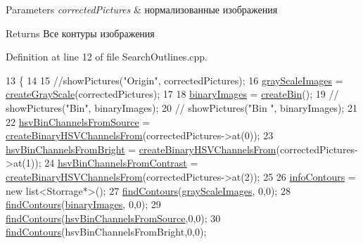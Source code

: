 \begin{DoxyParams}{Parameters}
{\em corrected\+Pictures} & нормализованные изображения \\
\hline
\end{DoxyParams}
\begin{DoxyReturn}{Returns}
Все контуры изображения 
\end{DoxyReturn}


Definition at line 12 of file Search\+Outlines.\+cpp.


\begin{DoxyCode}
13 \{
14 
15     \textcolor{comment}{//showPictures("Origin", correctedPictures);}
16     \hyperlink{class_search_outlines_a2284f3f55022613e11f2d023a6b76e07}{grayScaleImages} = \hyperlink{class_search_outlines_ae2c5d2a7cf350f53dec9e1d966a5045a}{createGrayScale}(correctedPictures);
17 
18     \hyperlink{class_search_outlines_ad32573709b7db29f00e5444110b37d23}{binaryImages} = \hyperlink{class_search_outlines_ac7706a914bd5abb1d2f21ecf13192461}{createBin}();
19 \textcolor{comment}{//    showPictures("Bin", binaryImages);}
20 \textcolor{comment}{//    showPictures("Bin ", binaryImages);}
21 
22     \hyperlink{class_search_outlines_a455efed931c502f14dbf88c87974214d}{hsvBinChannelsFromSource} = 
      \hyperlink{class_search_outlines_afb719de91ae7c9c8bcaf7e731223d9d5}{createBinaryHSVChannelsFrom}(correctedPictures->at(0));
23     \hyperlink{class_search_outlines_a1eb23566d056c92a441067d8c9cd03ae}{hsvBinChannelsFromBright} = 
      \hyperlink{class_search_outlines_afb719de91ae7c9c8bcaf7e731223d9d5}{createBinaryHSVChannelsFrom}(correctedPictures->at(1));
24     \hyperlink{class_search_outlines_a236b9910b73900271297548d3744d506}{hsvBinChannelsFromContrast} = 
      \hyperlink{class_search_outlines_afb719de91ae7c9c8bcaf7e731223d9d5}{createBinaryHSVChannelsFrom}(correctedPictures->at(2));
25 
26     \hyperlink{class_search_outlines_a1b1d7e6dd5c6c2b30c397f9f6d712dd1}{infoContours} = \textcolor{keyword}{new} list<Storrage*>();
27     \hyperlink{class_search_outlines_a9885ced6ec7391c1a702f6b03bf4fe14}{findContours}(\hyperlink{class_search_outlines_a2284f3f55022613e11f2d023a6b76e07}{grayScaleImages}, 0,0);
28     \hyperlink{class_search_outlines_a9885ced6ec7391c1a702f6b03bf4fe14}{findContours}(\hyperlink{class_search_outlines_ad32573709b7db29f00e5444110b37d23}{binaryImages}, 0,0);
29     \hyperlink{class_search_outlines_a9885ced6ec7391c1a702f6b03bf4fe14}{findContours}(\hyperlink{class_search_outlines_a455efed931c502f14dbf88c87974214d}{hsvBinChannelsFromSource},0,0);
30     \hyperlink{class_search_outlines_a9885ced6ec7391c1a702f6b03bf4fe14}{findContours}(hsvBinChannelsFromBright,0,0);

\end{DoxyCode}
